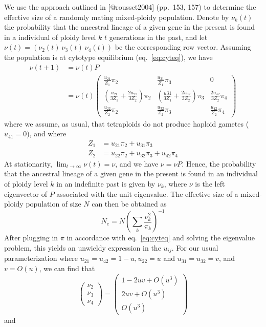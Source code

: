 We use the approach outlined in {[}@rousset2004{]} (pp.~153, 157) to
determine the effective size of a randomly mating mixed-ploidy
population. Denote by \(\nu_k(t)\) the probability that the ancestral
lineage of a given gene in the present is found in a individual of
ploidy level \(k\) \(t\) generations in the past, and let
\(\nu(t) = (\nu_2(t)\ \nu_3(t)\ \nu_4(t))\) be the corresponding row
vector. Assuming the population is at cytotype equilibrium
(eq.~\ref{eq:cyteq}), we have \begin{align}
      \nu(t+1) &= \nu(t) P \nonumber \\
               &= \nu(t) \begin{pmatrix}
      \frac{u_{21}}{Z_1}\pi_2 & \frac{u_{31}}{Z_1}\pi_3 & 0 \\
      \left(\frac{u_{21}}{3Z_1} + \frac{2u_{22}}{3Z_2}\right)\pi_2 &
          \left(\frac{u{31}}{3Z_1} + \frac{2u_{32}}{3Z_2}\right)\pi_3 & 
          \frac{2u_{42}}{3Z_2}\pi_4 \\
      \frac{u_{22}}{Z_2}\pi_2 & \frac{u_{32}}{Z_2}\pi_3 & \frac{u_{42}}{Z_2}\pi_4
      \label{eq:markovch}
       \end{pmatrix}
    \end{align} where we assume, as usual, that tetraploids do not
produce haploid gametes (\(u_{41} = 0\)), and where \begin{align*}
  Z_1 &= u_{21} \pi_2+ u_{31} \pi_3 \\
  Z_2 &= u_{22} \pi_2 + u_{32} \pi_3 + u_{42} \pi_4
\end{align*} At stationarity,
\(\lim_{t\rightarrow \infty} \nu(t) = \nu\), and we have
\(\nu = \nu P\). Hence, the probability that the ancestral lineage of a
given gene in the present is found in an individual of ploidy level
\(k\) in an indefinite past is given by \(\nu_k\), where \(\nu\) is the
left eigenvector of \(P\) associated with the unit eigenvalue. The
effective size of a mixed-ploidy population of size \(N\) can then be
obtained as \[N_e = N\left(\sum_k \frac{\nu_k^2}{\pi_k}\right)^{-1}\]
After plugging in \(\pi\) in accordance with eq.~\ref{eq:cyteq} and
solving the eigenvalue problem, this yields an unwieldy expression in
the \(u_{ij}\). For our usual parameterization where
\(u_{21} = u_{42} = 1-u, u_{22} = u\) and \(u_{31} = u_{32} = v\), and
\(v = O(u)\), we can find that
\[\begin{pmatrix}\nu_2 \\ \nu_3 \\ \nu_4\end{pmatrix} = \begin{pmatrix}
    1-2uv + O(u^3) \\ 2uv + O(u^3) \\ O(u^3)\end{pmatrix}\] and
